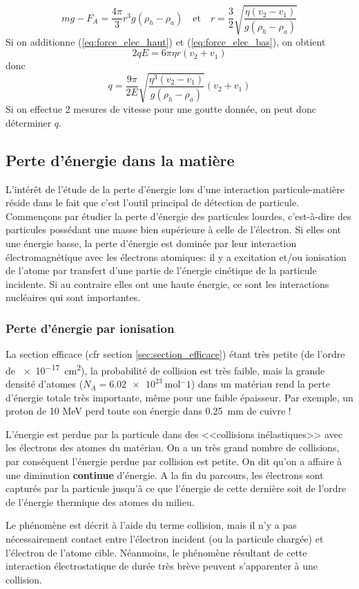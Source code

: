 \[
mg-F_A=\dfrac{4\pi}{3}r^3g(\rho_h-\rho_a)\quad\text{et}\quad
r=\dfrac{3}{2}\sqrt{\dfrac{\eta(v_2-v_1)}{g(\rho_h-\rho_a)}}
\]
Si on additionne (\ref{eq:force_elec_haut}) et (\ref{eq:force_elec_bas}), on obtient
\[
    2qE=6\pi\eta r(v_2+v_1)
\]
donc
\[
    q=\dfrac{9\pi}{2E}\sqrt{\dfrac{\eta^3(v_2-v_1)}{g(\rho_h-\rho_a)}}(v_2+v_1)
\]
Si on effectue 2 mesures de vitesse pour une goutte donnée, on peut donc déterminer $q$.

\subsection{Perte d'énergie dans la matière}

L'intérêt de l'étude de la perte d'énergie lors d'une interaction particule-matière réside dans le fait que c'est l'outil principal de détection de particule. Commençons par étudier la perte d'énergie des particules lourdes, c'est-à-dire des particules possédant une masse bien supérieure à celle de l'électron. Si elles ont une énergie basse, la perte d'énergie est dominée par leur interaction électromagnétique avec les électrons atomiques: il y a excitation et/ou ionisation de l'atome par transfert d'une partie de l'énergie cinétique de la particule incidente. Si au contraire elles ont une haute énergie, ce sont les interactions nucléaires qui sont importantes.

\subsubsection{Perte d'énergie par ionisation}
La section efficace (cfr section \ref{sec:section_efficace}) étant très petite (de l'ordre de \SI{e-17}{cm^2}), la probabilité de collision est très faible, mais la grande densité d'atomes ($N_A=\SI{6.02e23}{\mole^-1}$) dans un matériau rend la perte d'énergie totale très importante, même pour une faible épaisseur. Par exemple, un proton de 10 \si{MeV} perd toute son énergie dans \SI{0.25}{mm} de cuivre !

L'énergie est perdue par la particule dans des <<collisions inélastiques>> avec les électrons des atomes du matériau. On a un très grand nombre de collisions, par conséquent l'énergie perdue par collision est petite. On dit qu'on a affaire à une diminution \textbf{continue} d'énergie. A la fin du parcours, les électrons sont capturés par la particule jusqu'à ce que l'énergie de cette dernière soit de l'ordre de l'énergie thermique des atomes du milieu.

\begin{rem}
    Le phénomène est décrit à l'aide du terme collision, mais il n'y a pas nécessairement contact entre l'électron incident (ou la particule chargée) et l'électron de l'atome cible. Néanmoins, le phénomène résultant de cette interaction électrostatique de durée très brève peuvent s'apparenter à une collision.
\end{rem}

